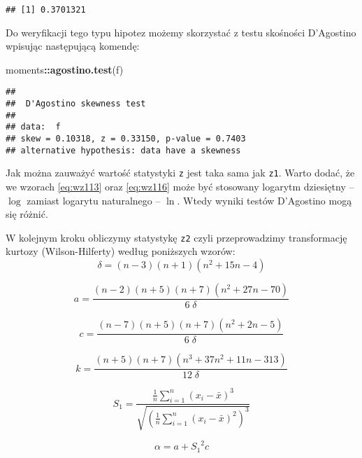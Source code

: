 \documentclass[polish,]{book}
\newenvironment{Shaded}{\begin{snugshade}}{\end{snugshade}}
\newcommand{\KeywordTok}[1]{\textcolor[rgb]{0.13,0.29,0.53}{\textbf{#1}}}
\newcommand{\NormalTok}[1]{#1}
\newcommand{\OperatorTok}[1]{\textcolor[rgb]{0.81,0.36,0.00}{\textbf{#1}}}
\begin{document}
\begin{verbatim}
## [1] 0.3701321
\end{verbatim}

Do weryfikacji tego typu hipotez możemy skorzystać z testu skośności D'Agostino
wpisując następującą komendę:

\begin{Shaded}
\begin{Highlighting}[]
\NormalTok{moments}\OperatorTok{::}\KeywordTok{agostino.test}\NormalTok{(f)}
\end{Highlighting}
\end{Shaded}

\begin{verbatim}
## 
##  D'Agostino skewness test
## 
## data:  f
## skew = 0.10318, z = 0.33150, p-value = 0.7403
## alternative hypothesis: data have a skewness
\end{verbatim}

Jak można zauważyć wartość statystyki \texttt{z} jest taka sama jak \texttt{z1}. Warto dodać, że we wzorach \eqref{eq:wz113} oraz \eqref{eq:wz116} może być stosowany
logarytm dziesiętny -- \(\log\) zamiast logarytu naturalnego -- \(\ln\). Wtedy wyniki
testów D'Agostino mogą się różnić.

W kolejnym kroku obliczymy statystykę \texttt{z2} czyli przeprowadzimy transformację
kurtozy (Wilson-Hilferty) według poniższych wzorów:
\begin{equation}
\delta= (n-3)(n+1)(n^2+15n-4)
\label{eq:wz117}
\end{equation}

\begin{equation}
a=\frac{(n-2)(n+5)(n+7)(n^2+27n-70)}{6\;\delta}
\label{eq:wz118}
\end{equation}

\begin{equation}
c=\frac{(n-7)(n+5)(n+7)(n^2+2n-5)}{6\;\delta}
\label{eq:wz119}
\end{equation}

\begin{equation}
k=\frac{(n+5)(n+7)(n^3+37n^2+11n-313)}{12\;\delta}
\label{eq:wz1110}
\end{equation}

\begin{equation}
S_1=\frac{\frac{1}{n}\sum_{i=1}^{n}(x_i-\bar{x})^3}{\sqrt{\left(\frac{1}{n}\sum_{i=1}^{n}(x_i-\bar{x})^2\right)^3}}
\label{eq:wz1111}
\end{equation}

\begin{equation}
\alpha=a+{S_1}^2c
\label{eq:wz1112}
\end{equation}
\end{document}
